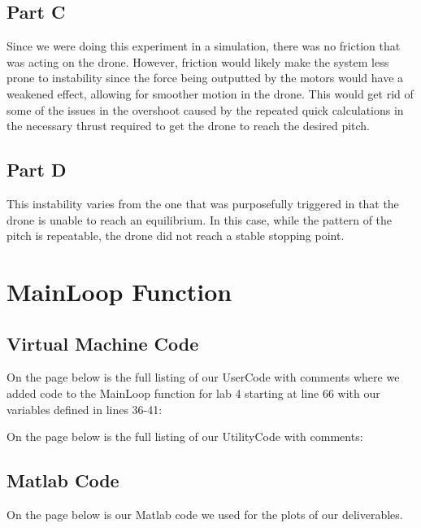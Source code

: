 \documentclass{article}
\begin{document}
\subsection{Part C}
Since we were doing this experiment in a simulation, there was no friction that was acting on the drone. However, friction would likely make the system less prone to instability since the force being outputted by the motors would have a weakened effect, allowing for smoother motion in the drone. This would get rid of some of the issues in the overshoot caused by the repeated quick calculations in the necessary thrust required to get the drone to reach the desired pitch.

\subsection{Part D}
This instability varies from the one that was purposefully triggered in that the drone is unable to reach an equilibrium. In this case, while the pattern of the pitch is repeatable, the drone did not reach a stable stopping point.

\section{MainLoop Function}

\subsection{Virtual Machine Code}

On the page below is the full listing of our UserCode with comments where we added code to the MainLoop function for lab 4 starting at line 66 with our variables defined in lines 36-41:


On the page below is the full listing of our UtilityCode with comments:


\subsection{Matlab Code} 
On the page below is our Matlab code we used for the plots of our deliverables.

 
\end{document}
